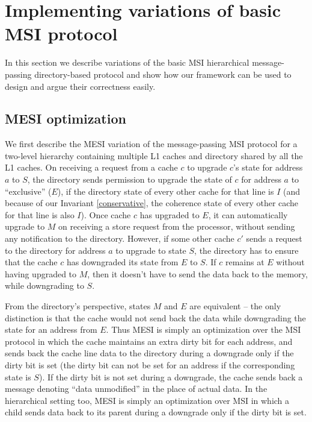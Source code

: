 \section{Implementing variations of basic MSI protocol}
\label{sec:variations}


\newcommand{\FwdReq}[3]{\text{$FwdReq\langle#1,#2\rightarrow#3\rangle$}}
\newcommand{\FwdAck}{\text{$FwdAck$}}


In this section we describe variations of the basic MSI hierarchical
message-passing directory-based protocol and show how our framework can be used
to design and argue their correctness easily.

\subsection{MESI optimization}
We first describe the MESI variation of the message-passing MSI protocol for a
two-level hierarchy containing multiple L1 caches and directory shared by all
the L1 caches. On receiving a request from a cache $c$ to upgrade $c$'s state
for address $a$ to $S$, the directory sends permission to upgrade the state of
$c$ for address $a$ to ``exclusive'' ($E$), if the directory state of every
other cache for that line is $I$ (and because of our Invariant
\ref{conservative}, the coherence state of every other cache for that line is
also $I$). Once cache $c$ has upgraded to $E$, it can automatically upgrade to
$M$ on receiving a store request from the processor, without sending any
notification to the directory.  However, if some other cache $c'$ sends a
request to the directory for address $a$ to upgrade to state $S$, the directory
has to ensure that the cache $c$ has downgraded its state from $E$ to $S$. If
$c$ remains at $E$ without having upgraded to $M$, then it doesn't have to send
the data back to the memory, while downgrading to $S$.

From the directory's perspective, states $M$ and $E$ are equivalent -- the only
distinction is that the cache would not send back the data while downgrading the
state for an address from $E$. Thus MESI is simply an optimization over the MSI
protocol in which the cache maintains an extra dirty bit for each address, and
sends back the cache line data to the directory during a downgrade only if the
dirty bit is set (the dirty bit can not be set for an address if the
corresponding state is $S$). If the dirty bit is not set during a downgrade, the
cache sends back a message denoting ``data unmodified'' in the place of actual
data. In the hierarchical setting too, MESI is simply an optimization over MSI
in which a child sends data back to its parent during a downgrade only if the
dirty bit is set.


